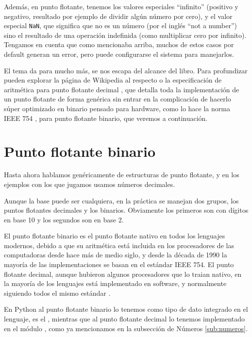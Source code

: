 Además, en punto flotante, tenemos los valores especiales ``infinito'' (positivo y negativo, resultado por ejemplo de dividir algún número por cero), y el valor especial \verb|NaN|, que significa que no es un número (por el inglés ``not a number'') sino el resultado de una operación indefinida (como multiplicar cero por infinito). Tengamos en cuenta que como mencionaba arriba, muchos de estos casos por default generan un error, pero puede configurarse el sistema para manejarlos.

El tema da para mucho más, se nos escapa del alcance del libro. Para profundizar pueden explorar la página de Wikipedia al respecto \cite{wikipedia-floating-point} o la especificación de aritmética para punto flotante decimal \cite{aritmetica-punto-flotante-decimal}, que detalla toda la implementación de un punto flotante de forma genérica sin entrar en la complicación de hacerlo súper optimizado en binario pensado para hardware, como lo hace la norma IEEE 754 \cite{ieee-754}, para punto flotante binario, que veremos a continuación.


\section{Punto flotante binario}\label{sec:pfbin}

Hasta ahora hablamos genéricamente de estructuras de punto flotante, y en los ejemplos con los que jugamos usamos números decimales. 

Aunque la base puede ser cualquiera, en la práctica se manejan dos grupos, los puntos flotantes decimales y los binarios. Obviamente los primeros son con dígitos en base 10 y los segundos son en base 2.

El punto flotante binario es el punto flotante nativo en todos los lenguajes modernos, debido a que su aritmética está incluida en los procesadores de las computadoras desde hace más de medio siglo, y desde la década de 1990 la mayoría de las implementaciones se basan en el estándar IEEE 754. El punto flotante decimal, aunque hubieron algunos procesadores que lo traian nativo, en la mayoría de los lenguajes está implementado en software, y normalmente siguiendo todos el mismo estándar \cite{decimal-spec}. 

En Python al punto flotante binario lo tenemos como tipo de dato integrado en el lenguaje, es el , mientras que al punto flotante decimal lo tenemos implementado en el módulo , como ya mencionamos en la subsección de Números \ref{sub:numeros}.

